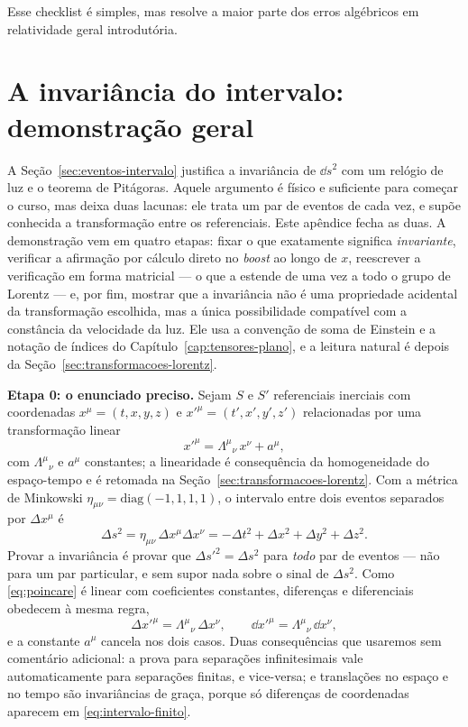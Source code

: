 \documentclass[12pt,a4paper,oneside]{book}
\theoremstyle{rgplain}
\theoremstyle{rgremark}
\begin{document}
Esse checklist é simples, mas resolve a maior parte dos erros algébricos em
relatividade geral introdutória.

\chapter{A invariância do intervalo: demonstração geral}
\label{ap:invariancia}

A Seção~\ref{sec:eventos-intervalo} justifica a invariância de $\dd s^2$ com
um relógio de luz e o teorema de Pitágoras. Aquele argumento é físico e
suficiente para começar o curso, mas deixa duas lacunas: ele trata um par de
eventos de cada vez, e supõe conhecida a transformação entre os referenciais.
Este apêndice fecha as duas. A demonstração vem em quatro etapas: fixar o que
exatamente significa \emph{invariante}, verificar a afirmação por cálculo
direto no \emph{boost} ao longo de $x$, reescrever a verificação em forma
matricial --- o que a estende de uma vez a todo o grupo de Lorentz --- e, por
fim, mostrar que a invariância não é uma propriedade acidental da
transformação escolhida, mas a única possibilidade compatível com a constância
da velocidade da luz. Ele usa a convenção de soma de Einstein e a notação de
índices do Capítulo~\ref{cap:tensores-plano}, e a leitura natural é depois da
Seção~\ref{sec:transformacoes-lorentz}.

\textbf{Etapa 0: o enunciado preciso.} Sejam $S$ e $S'$ referenciais inerciais
com coordenadas $x^\mu=(t,x,y,z)$ e $x'^\mu=(t',x',y',z')$ relacionadas por
uma transformação linear
\begin{equation}
  x'^\mu=\Lambda^\mu{}_\nu\,x^\nu+a^\mu,
  \label{eq:poincare}
\end{equation}
com $\Lambda^\mu{}_\nu$ e $a^\mu$ constantes; a linearidade é consequência da
homogeneidade do espaço-tempo e é retomada na
Seção~\ref{sec:transformacoes-lorentz}. Com a métrica de Minkowski
$\eta_{\mu\nu}=\mathrm{diag}(-1,1,1,1)$, o intervalo entre dois eventos
separados por $\Delta x^\mu$ é
\begin{equation}
  \Delta s^2=\eta_{\mu\nu}\,\Delta x^\mu\Delta x^\nu
  =-\Delta t^2+\Delta x^2+\Delta y^2+\Delta z^2 .
  \label{eq:intervalo-finito}
\end{equation}
Provar a invariância é provar que $\Delta s'^2=\Delta s^2$ para \emph{todo}
par de eventos --- não para um par particular, e sem supor nada sobre o sinal
de $\Delta s^2$. Como \eqref{eq:poincare} é linear com coeficientes
constantes, diferenças e diferenciais obedecem à mesma regra,
\[
  \Delta x'^\mu=\Lambda^\mu{}_\nu\,\Delta x^\nu,
  \qquad
  \dd x'^\mu=\Lambda^\mu{}_\nu\,\dd x^\nu,
\]
e a constante $a^\mu$ cancela nos dois casos. Duas consequências que usaremos
sem comentário adicional: a prova para separações infinitesimais vale
automaticamente para separações finitas, e vice-versa; e translações no espaço
e no tempo são invariâncias de graça, porque só diferenças de coordenadas
aparecem em \eqref{eq:intervalo-finito}.
\end{document}
